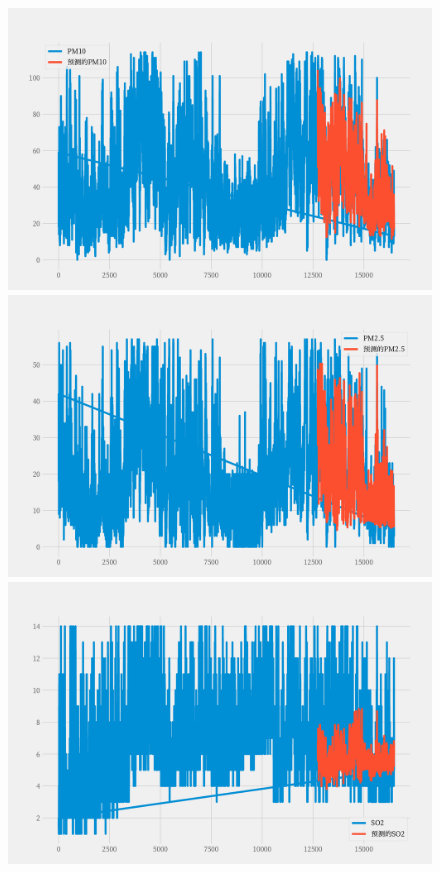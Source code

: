 \documentclass[a4paper,10pt]{my_paper}
\numberwithin{equation}{section}
\begin{document}
\begin{figure}[htbp]
\begin{minipage}[c]{0.3\textwidth}
			\includegraphics[width=1\textwidth]{prob4/预测A2地_PM10.pdf}
		\end{minipage}
		\begin{minipage}[c]{0.3\textwidth}
			\centering
			\includegraphics[width=1\textwidth]{prob4/预测A2地_PM2..pdf} 
		\end{minipage}
    \begin{minipage}[c]{0.3\textwidth}
			\centering
			\includegraphics[width=1\textwidth]{prob4/预测A2地_SO2.pdf} 

\end{minipage}
\end{figure}
\end{document}
